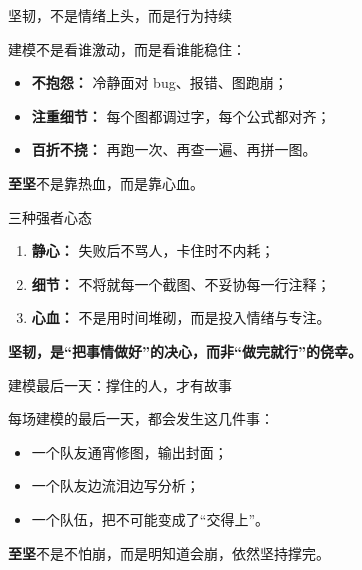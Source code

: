\begin{frame}{\color{deepnavy}坚韧，不是情绪上头，而是行为持续}
\justifying
{\color{darkcharcoal}
建模不是看谁激动，而是看谁能稳住：

\vspace{0.8em}
\begin{itemize}
  \item \textbf{不抱怨：} 冷静面对 bug、报错、图跑崩；
  \item \textbf{注重细节：} 每个图都调过字，每个公式都对齐；
  \item \textbf{百折不挠：} 再跑一次、再查一遍、再拼一图。
\end{itemize}

\vspace{0.5em}
\textbf{\color{emphasisred}至坚}不是靠热血，而是靠心血。
}
\end{frame}

\begin{frame}{\color{deepnavy}三种强者心态}
\justifying
{\color{darkcharcoal}
\begin{enumerate}
  \item \textbf{静心：} 失败后不骂人，卡住时不内耗；
  \item \textbf{细节：} 不将就每一个截图、不妥协每一行注释；
  \item \textbf{心血：} 不是用时间堆砌，而是投入情绪与专注。
\end{enumerate}

\vspace{0.5em}
\textbf{坚韧，是“把事情做好”的决心，而非“做完就行”的侥幸。}
}
\end{frame}

\begin{frame}{\color{deepnavy}建模最后一天：撑住的人，才有故事}
\justifying
{\color{darkcharcoal}
每场建模的最后一天，都会发生这几件事：

\vspace{0.5em}
\begin{itemize}
  \item 一个队友通宵修图，输出封面；
  \item 一个队友边流泪边写分析；
  \item 一个队伍，把不可能变成了“交得上”。
\end{itemize}

\vspace{0.5em}
\textbf{\color{emphasisred}至坚}不是不怕崩，而是明知道会崩，依然坚持撑完。
}
\end{frame}

